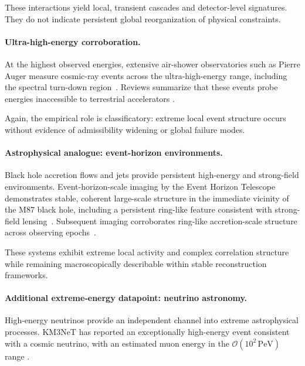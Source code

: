 \documentclass[aps,prx,onecolumn,11pt]{revtex4-2}
\theoremstyle{plain}
\theoremstyle{definition}
\theoremstyle{remark}
\begin{document}
These interactions yield local, transient cascades and detector-level
signatures. They do not indicate persistent global reorganization of
physical constraints.

\paragraph{Ultra-high-energy corroboration.}

At the highest observed energies, extensive air-shower observatories
such as Pierre Auger measure cosmic-ray events across the
ultra-high-energy range, including the spectral turn-down
region~\cite{Auger2021Spectrum}. Reviews summarize that these events
probe energies inaccessible to terrestrial accelerators
\cite{Globus2025UHECRreview}.

Again, the empirical role is classificatory: extreme local event
structure occurs without evidence of admissibility widening or global
failure modes.

\paragraph{Astrophysical analogue: event-horizon environments.}

Black hole accretion flows and jets provide persistent high-energy and
strong-field environments. Event-horizon-scale imaging by the Event
Horizon Telescope demonstrates stable, coherent large-scale structure
in the immediate vicinity of the M87 black hole, including a
persistent ring-like feature consistent with strong-field
lensing~\cite{EHT2019M87I,EHT2019M87VI}. Subsequent imaging
corroborates ring-like accretion-scale structure across observing
epochs~\cite{Lu2023M87Ring}.

These systems exhibit extreme local activity and complex correlation
structure while remaining macroscopically describable within stable
reconstruction frameworks.

\paragraph{Additional extreme-energy datapoint: neutrino astronomy.}

High-energy neutrinos provide an independent channel into extreme
astrophysical processes. KM3NeT has reported an exceptionally
high-energy event consistent with a cosmic neutrino, with an estimated
muon energy in the \(\mathcal{O}(10^2\,\mathrm{PeV})\) range
\cite{KM3NeT2025Nature}.
\end{document}
